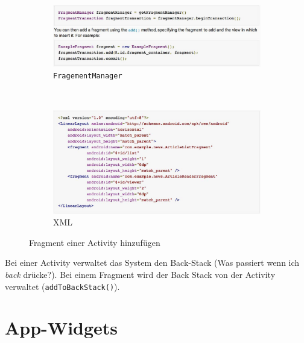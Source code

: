 \begin{figure}
	\centering
	\begin{subfigure}[b]{0.3\textwidth}
		\includegraphics[width=\textwidth]{fig/fragement-activity-code}
		\caption{\texttt{FragementManager}}
	\end{subfigure}
	~
	\begin{subfigure}[b]{0.3\textwidth}
		\includegraphics[width=\textwidth]{fig/fragement-activity-xml}
		\caption{XML}
	\end{subfigure}
	\caption{Fragment einer Activity hinzufügen}
	\label{fig:fragement-activity}
\end{figure}

Bei einer Activity verwaltet das System den Back-Stack (Was passiert wenn ich \emph{back} drücke?). Bei einem Fragment wird der Back Stack von der Activity verwaltet (\texttt{addToBackStack()}).

\section{App-Widgets}

